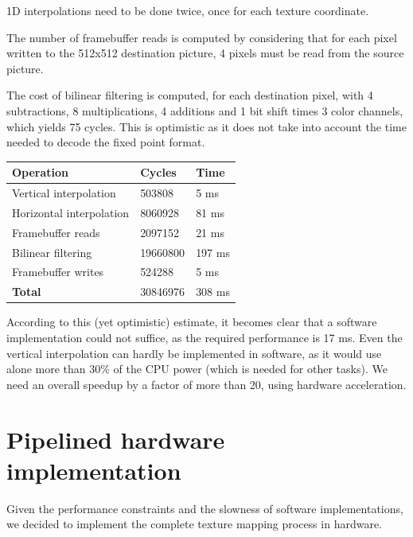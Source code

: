 \documentclass[a4paper,11pt]{kthesis}
\begin{document}
1D interpolations need to be done twice, once for each texture coordinate.

The number of framebuffer reads is computed by considering that for each pixel written to the 512x512 destination picture, 4 pixels must be read from the source picture.

The cost of bilinear filtering is computed, for each destination pixel, with 4 subtractions, 8 multiplications, 4 additions and 1 bit shift times 3 color channels, which yields 75 cycles. This is optimistic as it does not take into account the time needed to decode the fixed point format. \\
\begin{tabular}{|l|l|l|}
\hline
\textbf{Operation} & \textbf{Cycles} & \textbf{Time} \\
\hline
Vertical interpolation & 503808 & 5 ms \\
\hline
Horizontal interpolation & 8060928 & 81 ms \\
\hline
Framebuffer reads & 2097152 & 21 ms \\
\hline
Bilinear filtering & 19660800 & 197 ms \\
\hline
Framebuffer writes & 524288 & 5 ms \\
\hline
\textbf{Total} & 30846976 & 308 ms \\
\hline
\end{tabular}

According to this (yet optimistic) estimate, it becomes clear that a software implementation could not suffice, as the required performance is 17 ms. Even the vertical interpolation can hardly be implemented in software, as it would use alone more than 30\% of the CPU power (which is needed for other tasks). We need an overall speedup by a factor of more than 20, using hardware acceleration.

\section{Pipelined hardware implementation}
Given the performance constraints and the slowness of software implementations, we decided to implement the complete texture mapping process in hardware.
\end{document}
